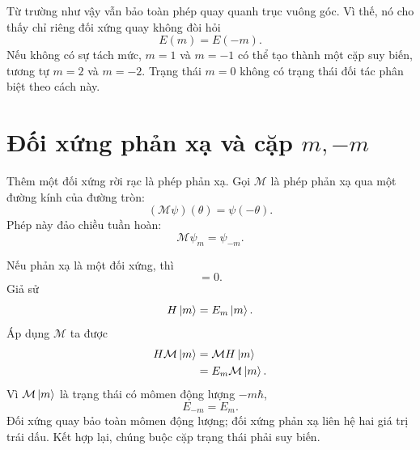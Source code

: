 Từ trường như vậy vẫn bảo toàn phép quay quanh trục vuông góc. Vì thế, nó cho thấy chỉ riêng đối xứng quay không đòi hỏi
\begin{equation}
E(m)=E(-m).
\end{equation}
Nếu không có sự tách mức, \(m=1\) và \(m=-1\) có thể tạo thành một cặp suy biến, tương tự \(m=2\) và \(m=-2\). Trạng thái \(m=0\) không có trạng thái đối tác phân biệt theo cách này.

\section{Đối xứng phản xạ và cặp \texorpdfstring{\(m,-m\)}{m, -m}}

Thêm một đối xứng rời rạc là phép phản xạ. Gọi \(\mathcal M\) là phép phản xạ qua một đường kính của đường tròn:
\begin{equation}
(\mathcal M\psi)(\theta)=\psi(-\theta).
\end{equation}
Phép này đảo chiều tuần hoàn:
\begin{equation}
\mathcal M\psi_m=\psi_{-m}.
\end{equation}

Nếu phản xạ là một đối xứng, thì
\begin{equation}
[\mathcal M,H]=0.
\end{equation}
Giả sử
\begin{equation}
H\left\lvert m\right\rangle=E_m\left\lvert m\right\rangle.
\end{equation}
Áp dụng \(\mathcal M\) ta được
\begin{align}
H\mathcal M\left\lvert m\right\rangle
&=\mathcal M H\left\lvert m\right\rangle\\
&=E_m\mathcal M\left\lvert m\right\rangle.
\end{align}
Vì \(\mathcal M\left\lvert m\right\rangle\) là trạng thái có mômen động lượng \(-m\hbar\),
\begin{equation}
E_{-m}=E_m.
\end{equation}
Đối xứng quay bảo toàn mômen động lượng; đối xứng phản xạ liên hệ hai giá trị trái dấu. Kết hợp lại, chúng buộc cặp trạng thái phải suy biến.

\begin{classroomqa}
\end{classroomqa}

